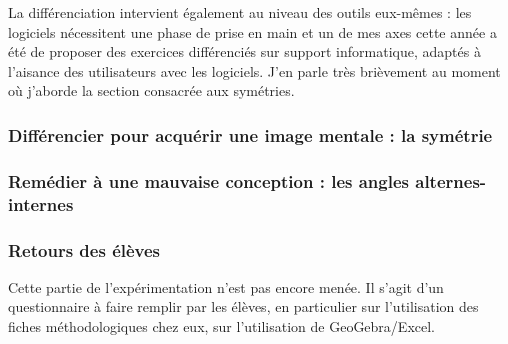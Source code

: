 La différenciation intervient également au niveau des outils eux-mêmes : les logiciels nécessitent une phase de prise en main et un de mes axes cette année a été de proposer des exercices différenciés sur support informatique, adaptés à l'aisance des utilisateurs avec les logiciels. J'en parle très brièvement au moment où j'aborde la section consacrée aux symétries.

\subsubsection{Différencier pour acquérir une image mentale : la symétrie}

\subsubsection{Remédier à une mauvaise conception : les angles alternes-internes}

\subsubsection{Retours des élèves}

Cette partie de l'expérimentation n'est pas encore menée. Il s'agit d'un questionnaire à faire remplir par les élèves, en particulier sur l'utilisation des fiches méthodologiques chez eux, sur l'utilisation de GeoGebra/Excel.

